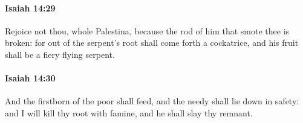 		\paragraph{Isaiah 14:29} %
			\label{ISAIAH-14-29}

			Rejoice not thou, whole Palestina, because the rod of him that smote thee is broken: for out of the serpent's root shall come forth a cockatrice, and his fruit shall be a fiery flying serpent.


		\paragraph{Isaiah 14:30} %
			\label{ISAIAH-14-30}

			And the firstborn of the poor shall feed, and the needy shall lie down in safety: and I will kill thy root with famine, and he shall slay thy remnant.


